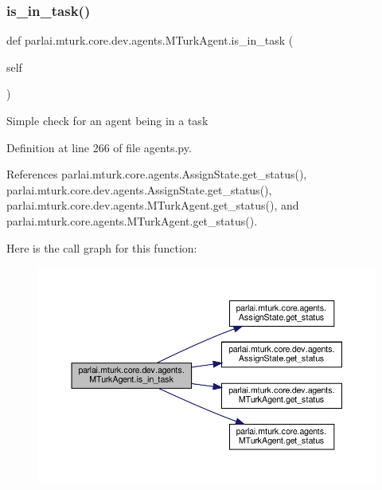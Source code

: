 \subsubsection{\texorpdfstring{is\+\_\+in\+\_\+task()}{is\_in\_task()}}
{\footnotesize\ttfamily def parlai.\+mturk.\+core.\+dev.\+agents.\+M\+Turk\+Agent.\+is\+\_\+in\+\_\+task (\begin{DoxyParamCaption}\item[{}]{self }\end{DoxyParamCaption})}

\begin{DoxyVerb}Simple check for an agent being in a task\end{DoxyVerb}
 

Definition at line 266 of file agents.\+py.



References parlai.\+mturk.\+core.\+agents.\+Assign\+State.\+get\+\_\+status(), parlai.\+mturk.\+core.\+dev.\+agents.\+Assign\+State.\+get\+\_\+status(), parlai.\+mturk.\+core.\+dev.\+agents.\+M\+Turk\+Agent.\+get\+\_\+status(), and parlai.\+mturk.\+core.\+agents.\+M\+Turk\+Agent.\+get\+\_\+status().

Here is the call graph for this function\+:
\nopagebreak
\begin{figure}[H]
\begin{center}
\leavevmode
\includegraphics[width=350pt]{classparlai_1_1mturk_1_1core_1_1dev_1_1agents_1_1MTurkAgent_a041a1bf11cb466ca9e270c4e423f2a9c_cgraph}
\end{center}
\end{figure}
\mbox{\label{classparlai_1_1mturk_1_1core_1_1dev_1_1agents_1_1MTurkAgent_af54df523a8cda0a7ed82f7d1e2c5af4b}} 
